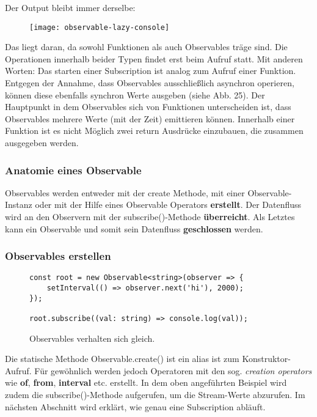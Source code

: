 \noindent
Der Output bleibt immer derselbe:
\begin{figure}[H]
\begin{center}
\texttt{[image: observable-lazy-console]}
\end{center}
\end{figure}

\noindent
Das liegt daran, da sowohl Funktionen als auch Observables träge sind. Die Operationen innerhalb beider Typen findet erst beim Aufruf statt. Mit anderen Worten: Das starten einer Subscription ist analog zum Aufruf einer Funktion. Entgegen der Annahme, dass Observables ausschließlich asynchron operieren, können diese ebenfalls synchron Werte ausgeben (siehe Abb. 25).
Der Hauptpunkt in dem Observables sich von Funktionen unterscheiden ist, dass Observables mehrere Werte (mit der Zeit) emittieren können. Innerhalb einer Funktion ist es nicht Möglich zwei return Ausdrücke einzubauen, die zusammen ausgegeben werden.

\subsubsection{Anatomie eines Observable}
Observables werden entweder mit der create Methode, mit einer Observable-Instanz oder mit der Hilfe eines Observable Operators \textbf{erstellt}. Der Datenfluss wird an den Observern mit der subscribe()-Methode \textbf{überreicht}. Als Letztes kann ein Observable und somit sein Datenfluss \textbf{geschlossen} werden.

\subsubsection{Observables erstellen}

\begin{figure}[H]
\begin{lstlisting}[basicstyle=\small]
const root = new Observable<string>(observer => {
    setInterval(() => observer.next('hi'), 2000);
});

root.subscribe((val: string) => console.log(val));
\end{lstlisting}
\caption{Observables verhalten sich gleich.}
\end{figure}

\noindent
Die statische Methode Observable.create() ist ein alias ist zum Konstruktor-Aufruf. Für gewöhnlich werden jedoch Operatoren mit den sog. \textit{creation operators} wie \textbf{of}, \textbf{from}, \textbf{interval} etc. erstellt. In dem oben angeführten Beispiel wird zudem die subscribe()-Methode aufgerufen, um die Stream-Werte abzurufen. Im nächsten Abschnitt wird erklärt, wie genau eine Subscription abläuft.\\

